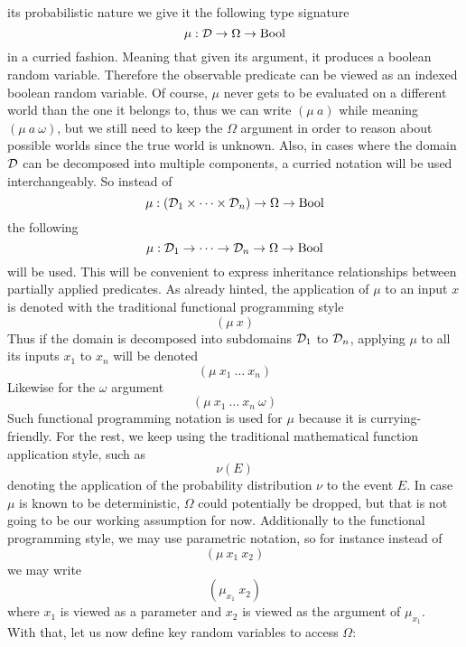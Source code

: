 \documentclass[]{article}
\begin{document}
its probabilistic nature we give it the following type signature
$$\mu : \mathcal{D} \to \Omega \to \textup{Bool}$$ in a curried fashion.  Meaning
that given its argument, it produces a boolean random variable.
Therefore the observable predicate can be viewed as an indexed boolean
random variable.  Of course, $\mu$ never gets to be evaluated on a
different world than the one it belongs to, thus we can write
$(\mu\ a)$ while meaning $(\mu\ a\ \omega)$, but we still need to keep
the $\Omega$ argument in order to reason about possible worlds since
the true world is unknown.  Also, in cases where the domain $\mathcal{D}$
can be decomposed into multiple components, a curried notation will be
used interchangeably.  So instead of
$$\mu : (\mathcal{D}_1 \times \dots \times \mathcal{D}_n) \to \Omega \to \textup{Bool}$$
the following
$$\mu : \mathcal{D}_1 \to \dots \to \mathcal{D}_n \to \Omega \to \textup{Bool}$$ will
be used.  This will be convenient to express inheritance relationships
between partially applied predicates.  As already hinted, the
application of $\mu$ to an input $x$ is denoted with the traditional
functional programming style
$$(\mu\ x)$$ Thus if the domain is decomposed into subdomains
$\mathcal{D}_1$ to $\mathcal{D}_n$, applying $\mu$ to all its inputs $x_1$ to
$x_n$ will be denoted
$$(\mu\ x_1\ \dots\ x_n)$$ Likewise for the $\omega$ argument
$$(\mu\ x_1\ \dots\ x_n\ \omega)$$ Such functional programming
notation is used for $\mu$ because it is currying-friendly.  For the
rest, we keep using the traditional mathematical function application
style, such as
$$\nu(E)$$ denoting the application of the probability distribution
$\nu$ to the event $E$.  In case $\mu$ is known to be deterministic,
$\Omega$ could potentially be dropped, but that is not going to be our
working assumption for now.  Additionally to the functional
programming style, we may use parametric notation, so for instance
instead of
$$(\mu\ x_1\ x_2)$$ we may write
$$(\mu_{x_1}\ x_2)$$ where $x_1$ is viewed as a parameter and $x_2$ is
viewed as the argument of $\mu_{x_1}$.\\
With that, let us now define key random variables to access $\Omega$:
\end{document}

